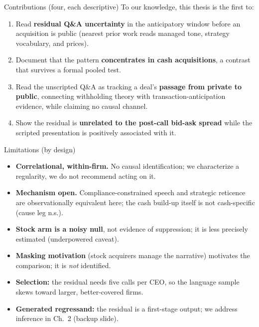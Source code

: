 \documentclass[aspectratio=169, 11pt]{beamer}
\begin{document}
\begin{frame}{Contributions (four, each descriptive)}
  To our knowledge, this thesis is the first to:
  \begin{enumerate}
    \item Read \textbf{residual Q\&A uncertainty} in the anticipatory window
      before an acquisition is public (nearest prior work reads managed tone,
      strategy vocabulary, and prices).
    \item Document that the pattern \textbf{concentrates in cash acquisitions},
      a contrast that survives a formal pooled test.
    \item Read the unscripted Q\&A as tracking a deal's
      \textbf{passage from private to public}, connecting withholding theory
      with transaction-anticipation evidence, while claiming no causal channel.
    \item Show the residual is \textbf{unrelated to the post-call bid-ask
      spread} while the scripted presentation is positively associated with it.
  \end{enumerate}
\end{frame}

\begin{frame}{Limitations (by design)}
  \begin{itemize}
    \item \textbf{Correlational, within-firm.} No causal identification;
      we characterize a regularity, we do not recommend acting on it.
    \item \textbf{Mechanism open.} Compliance-constrained speech and strategic
      reticence are observationally equivalent here; the cash build-up itself
      is not cash-specific (cause leg n.s.).
    \item \textbf{Stock arm is a noisy null}, not evidence of suppression;
      it is less precisely estimated (underpowered caveat).
    \item \textbf{Masking motivation} (stock acquirers manage the narrative)
      motivates the comparison; it is \emph{not} identified.
    \item \textbf{Selection:} the residual needs five calls per CEO, so the
      language sample skews toward larger, better-covered firms.
    \item \textbf{Generated regressand:} the residual is a first-stage output;
      we address inference in Ch.\ 2 (backup slide).
  \end{itemize}
\end{frame}
\end{document}
